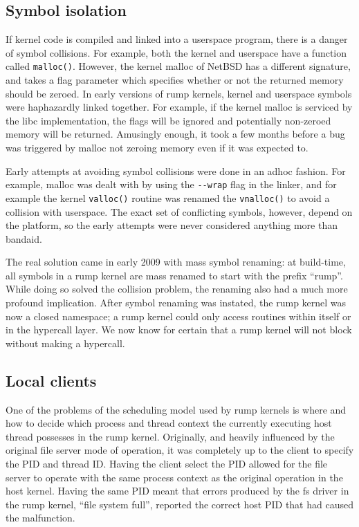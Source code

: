 \subsection{Symbol isolation}

If kernel code is compiled and linked into a userspace program, there is a
danger of symbol collisions.  For example, both the kernel and userspace
have a function called \verb+malloc()+.  However, the kernel malloc
of NetBSD has a different signature, and takes \eg a flag parameter
which specifies whether or not the returned memory should be zeroed.
In early versions of rump kernels, kernel and userspace symbols
were haphazardly linked together.  For example, if the kernel malloc
is serviced by the libc implementation, the flags will be ignored and
potentially non-zeroed memory will be returned.  Amusingly enough,
it took a few months before a bug was triggered by malloc not zeroing
memory even if it was expected to.

Early attempts at avoiding symbol collisions were done in an adhoc
fashion.  For example, malloc was dealt with by using the \verb+--wrap+
flag in the linker, and for example the kernel \verb+valloc()+ routine
was renamed the \verb+vnalloc()+ to avoid a collision with userspace.
The exact set of conflicting symbols, however, depend on the platform,
so the early attempts were never considered anything more than bandaid.

The real solution came in early 2009 with mass symbol renaming:
at build-time, all symbols in a rump kernel are mass renamed to start
with the prefix ``rump''.  While doing so solved the collision problem,
the renaming also had a much more profound implication.  After symbol
renaming was instated, the rump kernel was now a closed namespace; a rump
kernel could only access routines within itself or in the hypercall layer.
We now know for certain that a rump kernel will not block without making
a hypercall.


\subsection{Local clients}

One of the problems of the scheduling model used by rump kernels is
where and how to decide which process and thread context the currently
executing host thread possesses in the rump kernel.  Originally, and
heavily influenced by the original file server mode of operation, it was
completely up to the client to specify the PID and thread ID.  Having the
client select the PID allowed for the file server to operate with the
same process context as the original operation in the host kernel.
Having the same PID meant that errors produced by the fs driver in the
rump kernel, \eg ``file system full'', reported the correct host PID
that had caused the malfunction.

